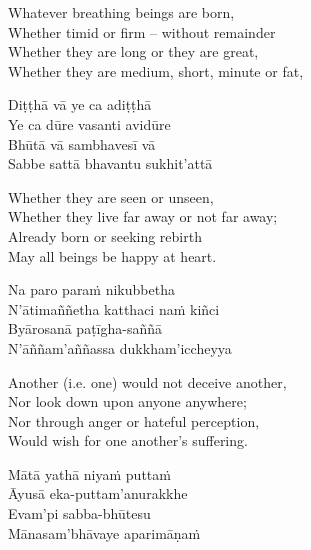 \begin{english-verses}
  Whatever breathing beings are born,\\
  Whether timid or firm – without remainder\\
  Whether they are long or they are great,\\
  Whether they are medium, short, minute or fat,
\end{english-verses}

\begin{pali-hang-continued}
  Diṭṭhā vā ye ca adiṭṭhā\\
  Ye ca dūre vasanti avidūre\\
  Bhūtā vā sambhavesī vā\\
  Sabbe sattā bhavantu sukhit'attā
\end{pali-hang-continued}

\begin{english-verses}
  Whether they are seen or unseen,\\
  Whether they live far away or not far away;\\
  Already born or seeking rebirth\\
  May all beings be happy at heart.
\end{english-verses}

\begin{pali-hang-continued}
  Na paro paraṁ nikubbetha\\
  N'ātimaññetha katthaci naṁ kiñci\\
  Byārosanā paṭīgha-saññā\\
  N'āññam'aññassa dukkham'iccheyya
\end{pali-hang-continued}

\begin{english-verses}
  Another (i.e. one) would not deceive another,\\
  Nor look down upon anyone anywhere;\\
  Nor through anger or hateful perception,\\
  Would wish for one another's suffering.
\end{english-verses}

\begin{pali-hang-continued}
  Mātā yathā niyaṁ puttaṁ\\
  Āyusā eka-puttam'anurakkhe\\
  Evam'pi sabba-bhūtesu\\
  Mānasam'bhāvaye aparimāṇaṁ
\end{pali-hang-continued}

